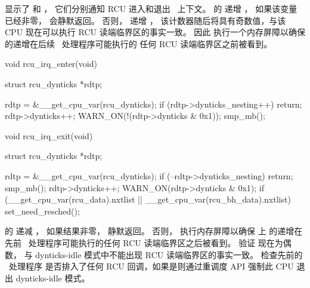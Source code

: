 \begin{fcvref}
显示了  和 ，
它们分别通知 RCU 进入和退出 \IRQ\ 上下文。
 的  递增 ，
如果该变量已经非零， 会静默返回。
否则， 递增 ，
该计数器随后将具有奇数值，与该 CPU 现在可以执行
RCU 读端临界区的事实一致。
因此  执行一个内存屏障以确保
 的递增在后续 \IRQ\ 处理程序可能执行的
任何 RCU 读端临界区之前被看到。

\begin{listing}
\begin{fcvlabel}
\begin{VerbatimL}[commandchars=\\\[\]]
void rcu_irq_enter(void)
{
	struct rcu_dynticks *rdtp;

	rdtp = &__get_cpu_var(rcu_dynticks);
	if (rdtp->dynticks_nesting++)		
		return;				\lnlbl[ret1]
	rdtp->dynticks++;			
	WARN_ON(!(rdtp->dynticks & 0x1));
	smp_mb();				\lnlbl[mb1]
}

void rcu_irq_exit(void)
{
	struct rcu_dynticks *rdtp;

	rdtp = &__get_cpu_var(rcu_dynticks);
	if (--rdtp->dynticks_nesting)		
		return;				\lnlbl[ret2]
	smp_mb();				\lnlbl[mb2]
	rdtp->dynticks++;			
	WARN_ON(rdtp->dynticks & 0x1);		
	if (__get_cpu_var(rcu_data).nxtlist ||	\lnlbl[chk_cb:b]
	    __get_cpu_var(rcu_bh_data).nxtlist)
		set_need_resched();		\lnlbl[chk_cb:e]
}
\end{VerbatimL}
\end{fcvlabel}
\caption{来自 Dynticks-Idle 模式的中断}
\label{lst:formal:Interrupts From Dynticks-Idle Mode}
\end{listing}

 的  递减 ，
如果结果非零， 静默返回。
否则， 执行内存屏障以确保
 上  的递增在先前
\IRQ\ 处理程序可能执行的任何 RCU 读端临界区之后被看到。
 验证  现在为偶数，
与 dynticks-idle 模式中不能出现 RCU 读端临界区的事实一致。
 检查先前的 \IRQ\ 处理程序
是否排入了任何 RCU 回调，如果是则通过重调度 API
强制此 CPU 退出 dynticks-idle 模式。
\end{fcvref}

